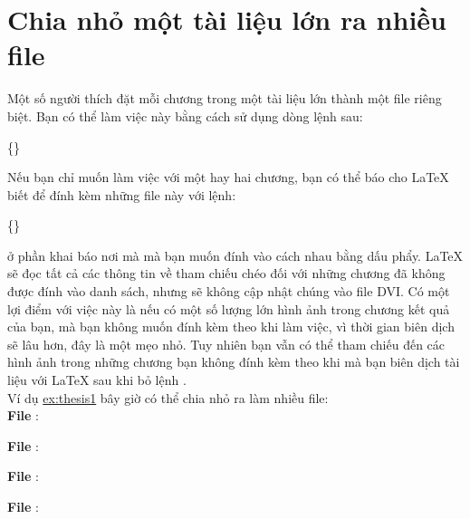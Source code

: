 \documentclass[a4paper]{report}
\begin{document}

\chapter{Chia nhỏ một tài liệu lớn ra nhiều file }

Một số người thích đặt mỗi chương trong một tài liệu lớn thành một file riêng biệt. Bạn có thể làm việc này bằng cách sử dụng dòng lệnh sau:

\begin{definition}
\{\}
\end{definition}%
Nếu bạn chỉ muốn làm việc với một hay hai chương, bạn có thể báo cho \LaTeX{} biết để đính kèm những file này với lệnh:

\begin{definition}
\{\}
\end{definition}%
ở phần khai báo nơi mà  mà bạn muốn đính vào cách nhau bằng dấu phẩy.
\LaTeX{} sẽ đọc tất cả các thông tin về tham chiếu chéo đối với những chương  đã không được đính vào danh sách, nhưng sẽ không cập nhật chúng vào file DVI. Có một lợi điểm với việc này là nếu có một số lượng lớn hình ảnh trong chương kết quả của bạn, mà bạn không muốn đính kèm theo khi làm việc, vì thời gian biên dịch sẽ lâu hơn, đây là một mẹo nhỏ. Tuy nhiên bạn vẫn có thể tham chiếu đến các hình ảnh trong những chương bạn không đính kèm theo khi mà bạn biên dịch tài liệu với \LaTeX{} sau khi bỏ lệnh .\\[2.0ex]

Ví dụ \hyperref{ở chương trước}{được nêu ra trong Chương~}{}{ex:thesis1}{} bây giờ có thể chia nhỏ ra làm nhiều file:\\

\noindent \textbf{File} :



\noindent \textbf{File} :



\noindent \textbf{File} :



\noindent \textbf{File} :
\end{document}
